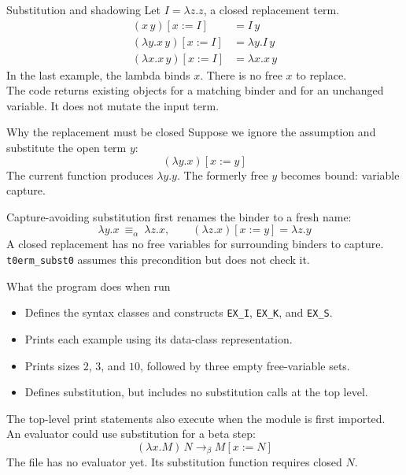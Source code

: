 \documentclass[aspectratio=169,11pt]{beamer}
\begin{document}
\begin{frame}{Substitution and shadowing}
Let $I=\lambda z.z$, a closed replacement term.
\begin{align*}
(x\,y)[x:=I] &= I\,y\\[0.5em]
(\lambda y.x\,y)[x:=I] &= \lambda y.I\,y\\[0.5em]
(\lambda x.x\,y)[x:=I] &= \lambda x.x\,y
\end{align*}
In the last example, the lambda binds $x$. There is no free $x$ to replace.\\[1em]
The code returns existing objects for a matching binder and for an unchanged variable. It does not mutate the input term.
\end{frame}

\begin{frame}{Why the replacement must be closed}
Suppose we ignore the assumption and substitute the open term $y$:
\[
(\lambda y.x)[x:=y]
\]
The current function produces $\lambda y.y$. The formerly free $y$ becomes bound: \alert{variable capture}.
\medskip

Capture-avoiding substitution first renames the binder to a fresh name:
\[
\lambda y.x\ \equiv_{\alpha}\ \lambda z.x,
\qquad (\lambda z.x)[x:=y]=\lambda z.y
\]
A closed replacement has no free variables for surrounding binders to capture.\\[0.7em]
\texttt{t0erm\_subst0} assumes this precondition but does not check it.
\end{frame}

\begin{frame}{What the program does when run}
\begin{itemize}
\item Defines the syntax classes and constructs \texttt{EX\_I}, \texttt{EX\_K}, and \texttt{EX\_S}.
\item Prints each example using its data-class representation.
\item Prints sizes $2$, $3$, and $10$, followed by three empty free-variable sets.
\item Defines substitution, but includes no substitution calls at the top level.
\end{itemize}
\medskip
The top-level print statements also execute when the module is first imported.\\[0.8em]
An evaluator could use substitution for a beta step:
\[
(\lambda x.M)\,N \longrightarrow_{\beta} M[x:=N]
\]
The file has no evaluator yet. Its substitution function requires closed $N$.
\end{frame}
\end{document}
